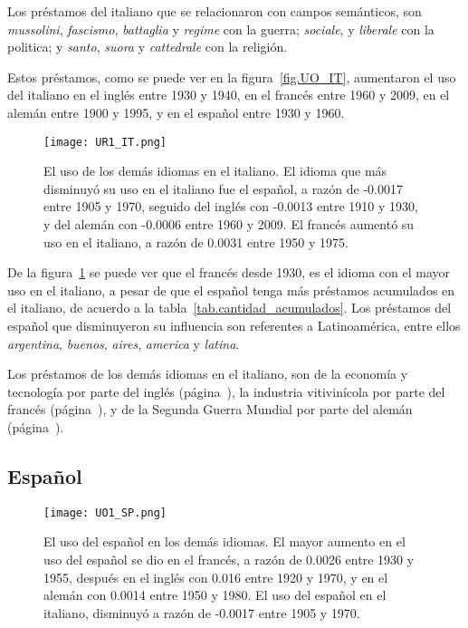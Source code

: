 Los préstamos del italiano que se relacionaron con campos semánticos, son \textit{mussolini}, \textit{fascismo}, \textit{battaglia} y \textit{regime} con la guerra; \textit{sociale},  y \textit{liberale} con la politica;  y \textit{santo}, \textit{suora} y \textit{cattedrale} con la religión.

Estos préstamos, como se puede ver en la figura~\ref{fig.UO_IT}, aumentaron el uso del italiano en el inglés entre 1930 y 1940, en el francés entre 1960 y 2009, en el alemán entre 1900 y 1995, y en el español entre 1930 y 1960.
\label{IT-D}


\begin{figure}[h!]
	\centering
	\texttt{[image: UR1\_IT.png]}
	\caption{El uso de los demás idiomas en el italiano. El idioma que más 
	disminuyó su uso en el italiano fue el español, a razón de -0.0017  entre 1905 y 1970, seguido del inglés con -0.0013 entre 1910 y 1930, y del alemán con -0.0006 entre 1960 y 2009. El francés aumentó su uso en el italiano, a razón de 0.0031 entre 1950 y 1975.}
	\label{fig.UR_IT}
\end{figure}

De la figura~\ref{fig.UR_IT} se puede ver que el francés desde 1930, es el idioma con el mayor uso en el italiano, a pesar de que el español tenga más préstamos acumulados en el italiano, de acuerdo a la tabla~\ref{tab.cantidad_acumulados}. Los préstamos del español que disminuyeron su influencia son referentes a Latinoamérica, entre ellos  \textit{argentina}, \textit{buenos}, \textit{aires}, \textit{america} y \textit{latina}.

Los préstamos de los demás idiomas en el italiano, son de la economía y tecnología por parte del inglés (página~\pageref{EN-D}), la industria vitivinícola por parte del francés (página~\pageref{FR-D}), y de la Segunda Guerra Mundial por parte del alemán (página~\pageref{GE-D}).

\label{DE-IT}



\subsection{Español} %
\begin{figure}[h!] %
	\centering
	\texttt{[image: UO1\_SP.png]}
	\caption{El uso del español en los demás idiomas. El mayor aumento en el uso del español se dio en el francés, a razón de 0.0026 entre 1930 y 1955, después en el inglés con 0.016 entre 1920 y 1970,  y en el alemán con 0.0014 entre 1950 y 1980. El uso del español en el italiano, disminuyó a razón de -0.0017 entre 1905 y 1970.}
	\label{fig.UO_SP}
	
\end{figure} %

